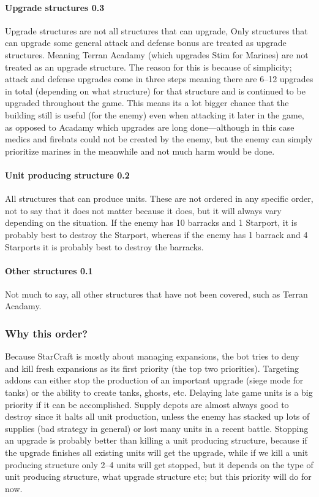 \paragraph{Upgrade structures 0.3\conf}
Upgrade structures are not all structures that can upgrade, Only structures that can upgrade some general attack and defense bonus are treated as upgrade structures. Meaning Terran Acadamy (which upgrades Stim for Marines) are not treated as an upgrade structure. The reason for this is because of simplicity; attack and defense upgrades come in three steps meaning there are 6–12 upgrades in total (depending on what structure) for that structure and is continued to be upgraded throughout the game. This means its a lot bigger chance that the building still is useful (for the enemy) even when attacking it later in the game, as opposed to Acadamy which upgrades are long done—although in this case medics and firebats could not be created by the enemy, but the enemy can simply prioritize marines in the meanwhile and not much harm would be done.

\paragraph{Unit producing structure 0.2\conf}
All structures that can produce units. These are not ordered in any specific order, not to say that it does not matter because it does, but it will always vary depending on the situation. If the enemy has 10 barracks and 1 Starport, it is probably best to destroy the Starport, whereas if the enemy has 1 barrack and 4 Starports it is probably best to destroy the barracks.

\paragraph{Other structures 0.1\conf}
Not much to say, all other structures that have not been covered, such as Terran Acadamy.

\subsubsection{Why this order?}
Because StarCraft is mostly about managing expansions\cite{day9}, the bot tries to deny and kill fresh expansions as its first priority (the top two priorities). Targeting addons can either stop the production of an important upgrade (siege mode for tanks) or the ability to create tanks, ghosts, etc. Delaying late game units is a big priority if it can be accomplished. Supply depots are almost always good to destroy since it halts all unit production, unless the enemy has stacked up lots of supplies (bad strategy in general) or lost many units in a recent battle. Stopping an upgrade is probably better than killing a unit producing structure, because if the upgrade finishes all existing units will get the upgrade, while if we kill a unit producing structure only 2–4 units will get stopped, but it depends on the type of unit producing structure, what upgrade structure etc; but this priority will do for now.